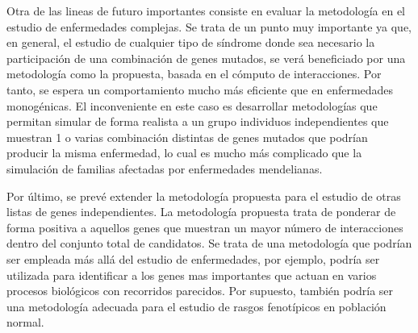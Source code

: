 \medskip
Otra de las lineas de futuro importantes consiste en evaluar la metodología en el estudio de enfermedades complejas. Se trata de un punto muy importante ya que, en general, el estudio de cualquier tipo de síndrome donde sea necesario la participación de una combinación de genes mutados, se verá beneficiado por una metodología como la propuesta, basada en el cómputo de interacciones. Por tanto, se espera un comportamiento mucho más eficiente que en enfermedades monogénicas. El inconveniente en este caso es desarrollar metodologías que permitan simular de forma realista a un grupo individuos independientes que muestran 1 o varias combinación distintas de genes mutados que podrían producir la misma enfermedad, lo cual es mucho más complicado que la simulación de familias afectadas por enfermedades mendelianas. 

\medskip
Por último, se prevé extender la metodología propuesta para el estudio de otras listas de genes independientes. La metodología propuesta trata de ponderar de forma positiva a aquellos genes que muestran un mayor número de interacciones dentro del conjunto total de candidatos. Se trata de una metodología que podrían ser empleada más allá del estudio de enfermedades, por ejemplo, podría ser utilizada para identificar a los genes mas importantes que actuan en varios procesos biológicos con recorridos parecidos. Por supuesto, también podría ser una metodología adecuada para el estudio de rasgos fenotípicos en población normal. 






